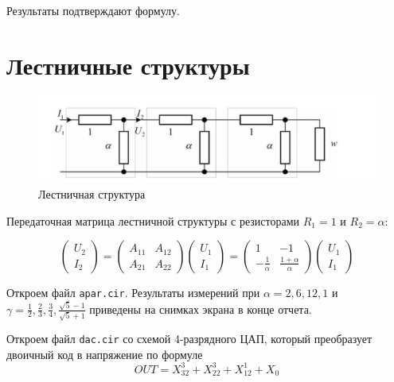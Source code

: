 \documentclass[a4paper, 12pt]{article}
\begin{document}
Результаты подтверждают формулу.

\newpage
\section{Лестничные структуры}
\begin{figure}[h]
  \centering
  \includegraphics[width=\textwidth]{apar.png}
  \caption{Лестничная структура}
\end{figure}

Передаточная матрица лестничной структуры с резисторами $R_1 = 1$ и $R_2 = \alpha$:

\begin{equation}
  \begin{pmatrix}
    U_2 \\
    I_2
  \end{pmatrix}
  =
  \begin{pmatrix}
    A_{11} & A_{12} \\
    A_{21} & A_{22}
  \end{pmatrix}
  \begin{pmatrix}
    U_1\\
    I_1
  \end{pmatrix}
  =
  \begin{pmatrix}
    1 & -1 \\
    -\frac{1}{\alpha} & \frac{1+\alpha}{\alpha}
  \end{pmatrix}
  \begin{pmatrix}
    U_1 \\
    I_1
  \end{pmatrix}
  \label{eq:apar}
\end{equation}

Откроем файл \texttt{apar.cir}. Результаты измерений при $\alpha = 2, 6, 12, 1$
и $\gamma = \frac{1}{2}, \frac{2}{3}, \frac{3}{4}, \frac{\sqrt{5} - 1}{\sqrt{5} + 1}$
приведены на снимках экрана в конце отчета.

Откроем файл \texttt{dac.cir} со схемой 4-разрядного ЦАП, который преобразует двоичный
код в напряжение по формуле
\begin{equation}
  OUT = X_32^3 + X_22^3 + X_12^1 + X_0
\end{equation}
\end{document}
